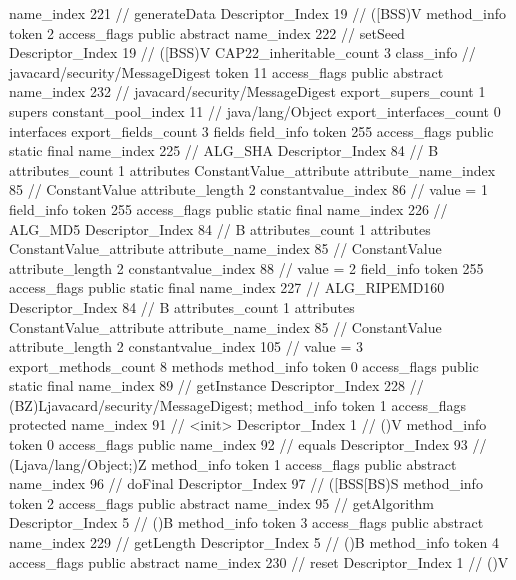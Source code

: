 {{{{{					name_index	221		// generateData
					Descriptor_Index	19		// ([BSS)V
				}
				method_info {
					token	2
					access_flags	public abstract
					name_index	222		// setSeed
					Descriptor_Index	19		// ([BSS)V
				}
			}
			CAP22_inheritable_count	3
		}
		class_info {		// javacard/security/MessageDigest
			token	11
			access_flags	public abstract
			name_index	232		// javacard/security/MessageDigest
			export_supers_count	1
			supers {
				constant_pool_index	11		// java/lang/Object
			}
			export_interfaces_count	0
			interfaces {
			}
			export_fields_count	3
			fields {
			field_info {
				token	255
				access_flags	public static final
				name_index	225		// ALG_SHA
				Descriptor_Index	84		// B
				attributes_count	1
				attributes {
				ConstantValue_attribute {
					attribute_name_index	85		// ConstantValue
					attribute_length	2
					constantvalue_index	86		// value = 1
				}
				}
			}
			field_info {
				token	255
				access_flags	public static final
				name_index	226		// ALG_MD5
				Descriptor_Index	84		// B
				attributes_count	1
				attributes {
				ConstantValue_attribute {
					attribute_name_index	85		// ConstantValue
					attribute_length	2
					constantvalue_index	88		// value = 2
				}
				}
			}
			field_info {
				token	255
				access_flags	public static final
				name_index	227		// ALG_RIPEMD160
				Descriptor_Index	84		// B
				attributes_count	1
				attributes {
				ConstantValue_attribute {
					attribute_name_index	85		// ConstantValue
					attribute_length	2
					constantvalue_index	105		// value = 3
				}
				}
			}
			}
			export_methods_count	8
			methods {
				method_info {
					token	0
					access_flags	public static final
					name_index	89		// getInstance
					Descriptor_Index	228		// (BZ)Ljavacard/security/MessageDigest;
				}
				method_info {
					token	1
					access_flags	protected
					name_index	91		// <init>
					Descriptor_Index	1		// ()V
				}
				method_info {
					token	0
					access_flags	public
					name_index	92		// equals
					Descriptor_Index	93		// (Ljava/lang/Object;)Z
				}
				method_info {
					token	1
					access_flags	public abstract
					name_index	96		// doFinal
					Descriptor_Index	97		// ([BSS[BS)S
				}
				method_info {
					token	2
					access_flags	public abstract
					name_index	95		// getAlgorithm
					Descriptor_Index	5		// ()B
				}
				method_info {
					token	3
					access_flags	public abstract
					name_index	229		// getLength
					Descriptor_Index	5		// ()B
				}
				method_info {
					token	4
					access_flags	public abstract
					name_index	230		// reset
					Descriptor_Index	1		// ()V
}}}}}
